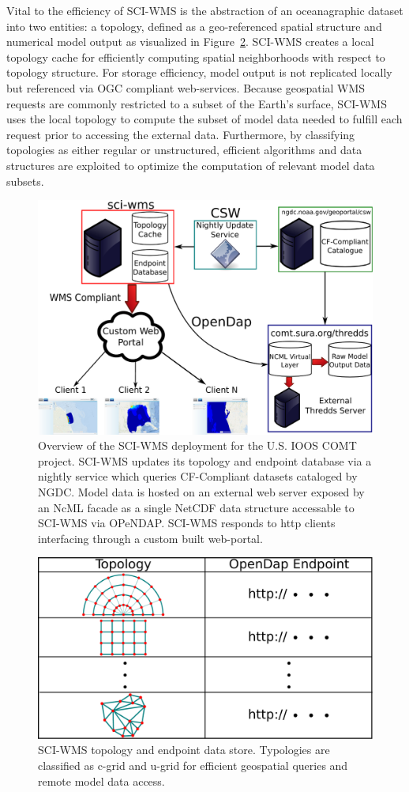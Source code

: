 \documentclass[11pt,twocolumn,twoside]{IEEEtran}
\newcommand{\comt}{COMT}
\newcommand{\ioos}{IOOS}
\newcommand{\wms}{WMS}
\newcommand{\ugrid}{u-grid}
\newcommand{\cgrid}{c-grid}
\newcommand{\ncml}{NcML}
\newcommand{\ngdc}{NGDC}
\newcommand{\opendap}{OPeNDAP}
\newcommand{\netcdf}{NetCDF}
\newcommand{\sciwms}{SCI-WMS}
\newcommand{\Sciwms}{SCI-WMS}
\begin{document}
Vital to the efficiency of \sciwms{} is the abstraction
of an oceanagraphic dataset into two entities: a topology, defined as
a geo-referenced spatial structure and numerical model output as
visualized in Figure~\ref{fig:sciwms_topology_endpoints}. \Sciwms{}
creates a local topology cache for efficiently computing spatial
neighborhoods with respect to topology structure.  For storage
efficiency, model output is not replicated locally but referenced via
OGC compliant web-services. Because geospatial \wms{} requests are
commonly restricted to a subset of the Earth's surface, \sciwms{} uses
the local topology to compute the subset of model data needed to
fulfill each request prior to accessing the external
data. Furthermore, by classifying topologies as either regular or
unstructured, efficient algorithms and data structures are exploited
to optimize the computation of relevant model data subsets.
\begin{figure}[ht!]
  \centering
  \includegraphics[width=0.7\columnwidth]{./figs/overview.pdf}
  \caption{Overview of the \sciwms{} deployment for the U.S. \ioos{}
    \comt{} project. \Sciwms{} updates its topology and endpoint
    database via a nightly service which queries CF-Compliant datasets
    cataloged by \ngdc{}. Model data is hosted on an external web server
    exposed by an \ncml{} facade as a single \netcdf{} data structure
    accessable to \sciwms{} via \opendap{}. \Sciwms{} responds to http
    clients interfacing through a custom built web-portal.}
  \label{fig:overview1}
\end{figure}
\begin{figure}[ht!]
  \centering
  \includegraphics[width=0.6\columnwidth]{./figs/sciwms_db_topology_endpoints.pdf}
  \caption{\Sciwms{} topology and endpoint data store. Typologies are
    classified as \cgrid{} and \ugrid{} for efficient geospatial
    queries and remote model data access.}
  \label{fig:sciwms_topology_endpoints}
\end{figure}
\end{document}
